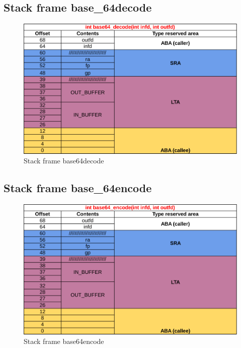 \documentclass[11pt,a4paper]{article}
\begin{document}
\subsection{Stack frame base\_64decode}
\begin{figure}[H]
  \centering
    \includegraphics[width=14cm]{base64decodeStackFrame}
    \caption{Stack frame base64decode}
  \label{fig:base64decodeStackFrame}
\end{figure}

\subsection{Stack frame base\_64encode}
\begin{figure}[H]
  \centering
    \includegraphics[width=14cm]{base64encodeStackFrame}
    \caption{Stack frame base64encode}
  \label{fig:base64encodeStackFrame}
\end{figure}
\end{document}

